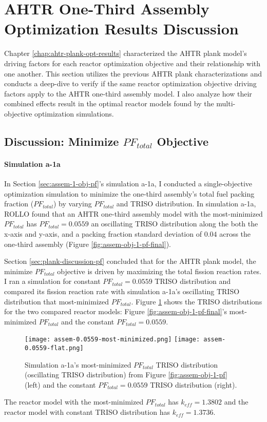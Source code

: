 \section{AHTR One-Third Assembly Optimization Results Discussion}
\label{sec:assem-discussion}
Chapter \ref{chap:ahtr-plank-opt-results} characterized the \gls{AHTR} plank model's 
driving factors for each reactor optimization objective and their relationship with 
one another. 
This section utilizes the previous \gls{AHTR} plank characterizations and conducts 
a deep-dive to verify if the same reactor optimization objective driving factors apply 
to the \gls{AHTR} one-third assembly model. 
I also analyze how their combined effects result in the optimal reactor models found by 
the multi-objective optimization simulations. 

\subsection{Discussion: Minimize $PF_{total}$ Objective}
\label{sec:assem-discussion-pf}
\paragraph{Simulation a-1a}
In Section \ref{sec:assem-1-obj-pf}'s simulation a-1a, I conducted a single-objective 
optimization simulation to minimize the one-third assembly's total fuel packing fraction 
($PF_{total}$) by varying $PF_{total}$ and TRISO distribution. 
In simulation a-1a, \gls{ROLLO} found that an \gls{AHTR} one-third assembly model with 
the most-minimized $PF_{total}$ has $PF_{total}= 0.0559$ an oscillating TRISO distribution 
along the both the x-axis and y-axis, and a packing fraction standard deviation of 
$0.04$ across the one-third assembly (Figure \ref{fig:assem-obj-1-pf-final}).

Section \ref{sec:plank-discussion-pf} concluded that for the \gls{AHTR} plank model, 
the minimize $PF_{total}$ objective is driven by maximizing the total fission reaction 
rates. 
I ran a simulation for constant $PF_{total} = 0.0559$ TRISO distribution and compared its 
fission reaction rate with simulation a-1a's oscillating TRISO distribution that 
most-minimized $PF_{total}$. 
Figure \ref{fig:assem-0.0559-comparison} shows the TRISO distributions for the two 
compared reactor models: Figure \ref{fig:assem-obj-1-pf-final}'s most-minimized 
$PF_{total}$ and the constant $PF_{total} = 0.0559$. 
\begin{figure}[htbp!]
    \centering
    \texttt{[image: assem-0.0559-most-minimized.png]} 
    \texttt{[image: assem-0.0559-flat.png]} 
    \caption{Simulation a-1a's most-minimized $PF_{total}$ TRISO distribution 
    (oscillating TRISO distribution) from Figure \ref{fig:assem-obj-1-pf} (left) and the 
    constant $PF_{total} = 0.0559$ TRISO distribution (right).}
    \label{fig:assem-0.0559-comparison}
\end{figure}
The reactor model with the most-minimized $PF_{total}$ has $k_{eff}=1.3802$ and 
the reactor model with constant TRISO distribution has $k_{eff}=1.3736$.

